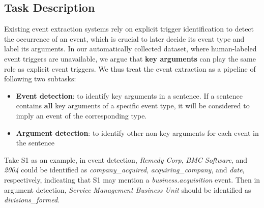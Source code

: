 
\subsection{Task Description}
Existing event extraction systems rely on explicit trigger identification to detect the occurrence of an event, 
which is crucial to later decide its event type and label its arguments.
In our automatically collected dataset, where human-labeled event triggers are unavailable, we argue that \textbf{key arguments} can play the same role as explicit event triggers. 
We thus treat the event extraction as a pipeline of following two subtasks: 
\begin{itemize}
	\item \textbf{Event detection}: to identify key arguments in a sentence. If a sentence contains \textbf{all} key arguments of a specific event type, it will be considered to imply an event of the corresponding type. 
	\item \textbf{Argument detection}: to identify other non-key arguments for each event in the sentence
\end{itemize}

Take S1 as an example, in event detection, \emph{Remedy Corp}, \emph{BMC Software}, and \emph{2004} could be identified as \emph{company\_acquired}, \emph{acquiring\_company}, and \emph{date}, respectively, indicating that S1 may mention a \emph{business.acquisition} event. 
Then in argument detection, \emph{Service Management Business Unit} should be identified as \emph{divisions\_formed}.
